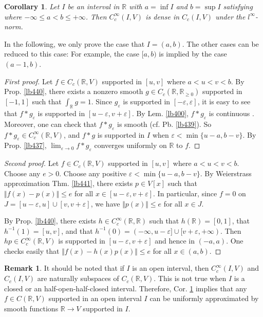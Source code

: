 \documentclass[12pt,b5paper,notitlepage]{article}
\theoremstyle{definition}
\newtheorem{rem}[df]{Remark}
\theoremstyle{plain}
\newtheorem{co}[df]{Corollary}
\newcommand{\Rbb}{\mathbb R}
\newcommand{\eps}{\varepsilon}
\numberwithin{equation}{section}
\begin{document}
\begin{co}\label{lb446}
Let $I$ be an interval in $\Rbb$ with $a=\inf I$ and $b=\sup I$ satisfying where $-\infty\leq a<b\leq+\infty$. Then $C_c^\infty(I,V)$ is dense in $C_c(I,V)$ under the $l^\infty$-norm.
\end{co}

In the following, we only prove the case that $I=(a,b)$. The other cases can be reduced to this case: For example, the case $[a,b)$ is implied by the case $(a-1,b)$.

\begin{proof}[First proof]
Let $f\in C_c(\Rbb,V)$ supported in $[u,v]$ where $a<u<v<b$. By Prop. \ref{lb440}, there exists a nonzero smooth $g\in C_c(\Rbb,\Rbb_{\geq0})$ supported in $[-1,1]$ such that $\int_\Rbb g=1$. Since $g_\eps$ is supported in $[-\eps,\eps]$, it is easy to see that $f*g_\eps$ is supported in $[u-\eps,v+\eps]$. By Lem. \ref{lb400}, $f*g_\eps$ is continuous . Moreover, one can check that $f*g_\eps$ is smooth (cf. Pb. \ref{lb439}). So $f*g_\eps\in C_c^\infty(\Rbb,V)$, and $f*g$ is supported in $I$ when $\eps<\min\{u-a,b-v\}$. By Prop. \ref{lb437}, $\lim_{\eps\rightarrow 0}f*g_\eps$ converges uniformly on $\Rbb$ to $f$.
\end{proof}



\begin{proof}[Second proof]
Let $f\in C_c(\Rbb,V)$ supported in $[u,v]$ where $a<u<v<b$. Choose any $e>0$. Choose any positive $\eps<\min\{u-a,b-v\}$. By Weierstrass approximation Thm. \ref{lb441}, there exists $p\in V[x]$ such that $\Vert f(x)- p(x)\Vert\leq e$ for all $x\in[u-\eps,v+\eps]$. In particular, since $f=0$ on $J=[u-\eps,u]\cup[v,v+\eps]$, we have $\Vert p(x)\Vert\leq e$ for all $x\in J$. 

By Prop. \ref{lb440}, there exists $h\in C_c^\infty(\Rbb,\Rbb)$ such that $h(\Rbb)=[0,1]$, that $h^{-1}(1)=[u,v]$, and that $h^{-1}(0)=(-\infty,u-\eps]\cup[v+\eps,+\infty)$. Then $hp\in C_c^\infty(\Rbb,V)$ is supported in $[u-\eps,v+\eps]$ and hence in $(-a,a)$. One checks easily that $\Vert f(x)-h(x)p(x)\Vert\leq e$ for all $x\in(a,b)$.
\end{proof}


\begin{rem}
It should be noted that if $I$ is an open interval, then $C_c^\infty(I,V)$ and $C_c(I,V)$ are naturally subspaces of $C_c(\Rbb,V)$. This is not true when $I$ is a closed or an half-open-half-closed interval. Therefore, Cor. \ref{lb446} implies that any $f\in C(\Rbb,V)$ supported in an open interval $I$ can be uniformly approximated by smooth functions $\Rbb\rightarrow V$ supported in $I$.
\end{rem}
\end{document}
